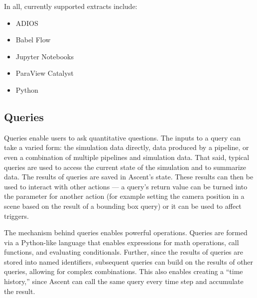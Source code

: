 In all, currently supported extracts include:
\begin{itemize}
\item ADIOS
\item Babel Flow~\cite{babelflow}
\item Jupyter Notebooks
\item ParaView Catalyst
\item Python
\end{itemize}

\subsection{Queries}
\label{action_queries}
Queries enable users to ask quantitative questions.
%
The inputs to a query can take a varied form:
the simulation data directly,
data produced by a pipeline,
or even a combination of multiple pipelines and simulation data.
%
That said, typical queries are used to access the current state of the simulation
and to summarize data.
%
The results of queries are saved in Ascent's state.
%
These results can then be used to
interact with other actions --- a query's return value can be turned
into the parameter for another action (for example setting the camera position in a scene based
on the result of a bounding box query) or it can be used to affect triggers.
%

The mechanism behind queries enables powerful operations.
%
Queries are formed via a Python-like language that
enables expressions for math operations,
call functions, and evaluating conditionals.
%
Further, since the results of queries are stored into named identifiers, subsequent queries
can build on the results of other queries, allowing for complex combinations.
%
%
This also enables creating a ``time history,'' since
Ascent can call the same query every time step and accumulate the result.


%
%

